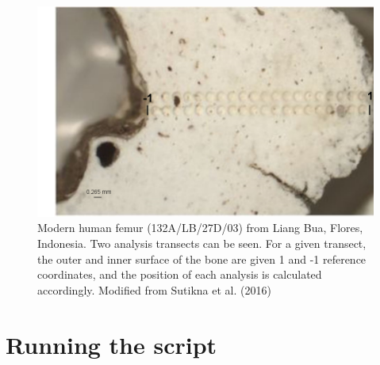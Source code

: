 \documentclass[]{article}
\begin{document}
\begin{figure}
\centering
\includegraphics{input/bone.png}
\caption{Modern human femur (132A/LB/27D/03) from Liang Bua, Flores,
Indonesia. Two analysis transects can be seen. For a given transect, the
outer and inner surface of the bone are given 1 and -1 reference
coordinates, and the position of each analysis is calculated
accordingly. Modified from Sutikna et al. (2016)}
\end{figure}

\hypertarget{running-the-script}{%
\section{Running the script}\label{running-the-script}}
\end{document}
